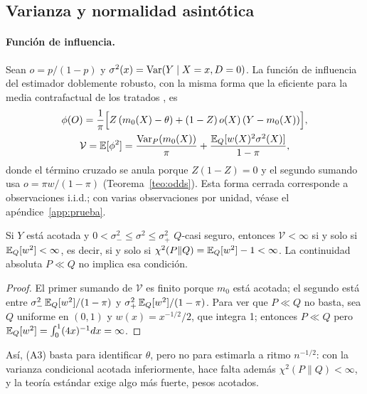 \subsection{Varianza y normalidad asintótica}

\paragraph{Función de influencia.} Sean $o=p/(1-p)$ y $\sigma^2(x)=\operatorname{Var}(Y\mid X=x,D=0)$. La función de influencia del estimador doblemente robusto, con la misma forma que la eficiente para la media contrafactual de los tratados \citep{hahn1998}, es
\begin{gather*}
\phi(O)=\frac1\pi\Bigl[Z\,(m_0(X)-\theta)+(1-Z)\,o(X)\,(Y-m_0(X))\Bigr],\\
\mathcal V=\mathbb{E}[\phi^2]=\frac{\operatorname{Var}_P(m_0(X))}{\pi}+\frac{\mathbb{E}_Q[w(X)^2\sigma^2(X)]}{1-\pi},
\end{gather*}
donde el término cruzado se anula porque $Z(1-Z)=0$ y el segundo sumando usa $o=\pi w/(1-\pi)$ (Teorema~\ref{teo:odds}). Esta forma cerrada corresponde a observaciones i.i.d.; con varias observaciones por unidad, véase el apéndice~\ref{app:prueba}.

\begin{proposicion}\label{prop:varianza}
Si $Y$ está acotada y $0<\sigma_-^2\le\sigma^2\le\sigma_+^2$ $Q$-casi seguro, entonces $\mathcal V<\infty$ si y solo si $\mathbb{E}_Q[w^2]<\infty$, es decir, si y solo si $\chi^2(P\|Q)=\mathbb{E}_Q[w^2]-1<\infty$. La continuidad absoluta $P\ll Q$ no implica esa condición.
\end{proposicion}
\begin{proof}
El primer sumando de $\mathcal V$ es finito porque $m_0$ está acotada; el segundo está entre $\sigma_-^2\,\mathbb{E}_Q[w^2]/(1-\pi)$ y $\sigma_+^2\,\mathbb{E}_Q[w^2]/(1-\pi)$. Para ver que $P\ll Q$ no basta, sea $Q$ uniforme en $(0,1)$ y $w(x)=x^{-1/2}/2$, que integra 1; entonces $P\ll Q$ pero $\mathbb{E}_Q[w^2]=\int_0^1(4x)^{-1}dx=\infty$.
\end{proof}

Así, (A3) basta para identificar $\theta$, pero no para estimarla a ritmo $n^{-1/2}$: con la varianza condicional acotada inferiormente, hace falta además $\chi^2(P\|Q)<\infty$, y la teoría estándar exige algo más fuerte, pesos acotados.

